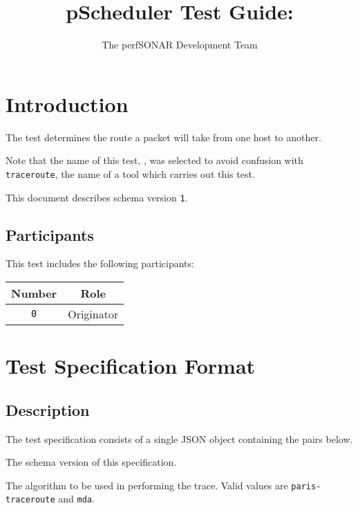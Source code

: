 \documentclass[10pt]{article}
\title{pScheduler Test Guide: {\it \testname}}
\author{The perfSONAR Development Team}
\begin{document}
\maketitle


%
%

\section{Introduction}

The {\tt \testname} test determines the route a packet will take from
one host to another.

Note that the name of this test, {\tt \testname}, was selected to
avoid confusion with {\tt traceroute}, the name of a tool which
carries out this test.

This document describes schema version {\tt 1}.

\subsection{Participants}

This test includes the following participants:

\begin{center}
\begin{tabular}{|c|c|}
\hline
{\bf Number} & {\bf Role} \\
\hline
{\tt 0} & Originator \\
\hline
\end{tabular}
\end{center}



%
%

\section{Test Specification Format}

\subsection{Description}

The test specification consists of a single JSON object containing the
pairs below.  \seejson

 The schema version of this specification.

 The algorithm to be used in performing the
trace.  Valid values are {\tt paris-traceroute} and {\tt mda}.
\end{document}
